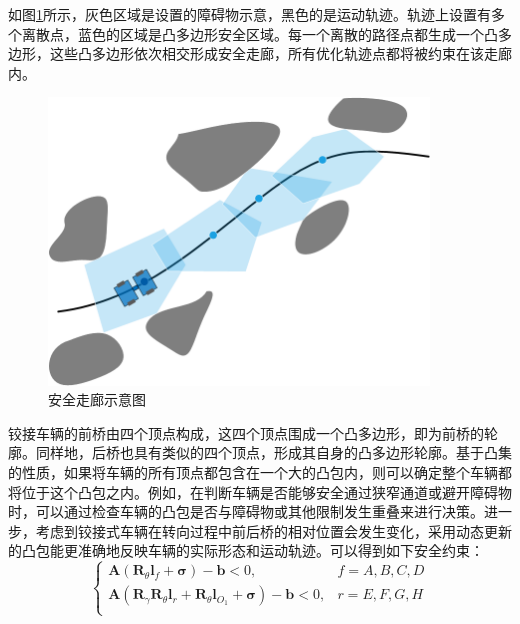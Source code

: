 \documentclass[master,academic]{ysuthesis} %
\begin{document}
		如图\ref{fig:安全走廊}所示，灰色区域是设置的障碍物示意，黑色的是运动轨迹。轨迹上设置有多个离散点，蓝色的区域是凸多边形安全区域。每一个离散的路径点都生成一个凸多边形，这些凸多边形依次相交形成安全走廊，所有优化轨迹点都将被约束在该走廊内。

		\newpage
		\vspace*{-1.5em}

		\begin{figure}[H]
			\centering
			\includegraphics[width=0.9\textwidth]{安全走廊.png}
			\caption{安全走廊示意图}
			\label{fig:安全走廊}
		\end{figure}

		铰接车辆的前桥由四个顶点构成，这四个顶点围成一个凸多边形，即为前桥的轮廓。同样地，后桥也具有类似的四个顶点，形成其自身的凸多边形轮廓。基于凸集的性质，如果将车辆的所有顶点都包含在一个大的凸包内，则可以确定整个车辆都将位于这个凸包之内。例如，在判断车辆是否能够安全通过狭窄通道或避开障碍物时，可以通过检查车辆的凸包是否与障碍物或其他限制发生重叠来进行决策。进一步，考虑到铰接式车辆在转向过程中前后桥的相对位置会发生变化，采用动态更新的凸包能更准确地反映车辆的实际形态和运动轨迹。可以得到如下安全约束：
		\begin{equation}
			\left\{ \begin{matrix}
				\bm{A}\left( \bm{R}_{\theta}\bm{l}_f+\bm{\sigma} \right) -\bm{b}<0,&		f=A,B,C,D\\
				\bm{A}\left( \bm{R}_{\gamma}\bm{R}_{\theta}\bm{l}_r+\bm{R}_{\theta}\bm{l}_{O_1}+\bm{\sigma} \right) -\bm{b}<0,&		r=E,F,G,H\\
			\end{matrix} \right. 
		\end{equation}
\end{document}
